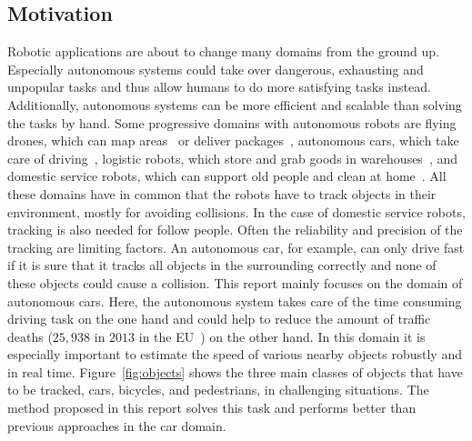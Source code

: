 \documentclass[twoside,a4paper,article]{combine}
\begin{document}
\subsection{Motivation}
\label{sub:motivation}
Robotic applications are about to change many domains from the ground
up. Especially autonomous systems could take over dangerous,
exhausting and unpopular tasks and thus allow humans to do more satisfying
tasks instead. Additionally, autonomous systems can be more efficient
and scalable than solving the tasks by hand. Some progressive domains
with autonomous robots are flying drones, which can map
areas~\cite{auto-drones} or deliver
packages~\cite{auto-delivery-drones}, autonomous cars, which take care
of driving~\cite{auto-cars}, logistic robots, which store and grab
goods in warehouses~\cite{kiva}, and domestic service robots, which
can support old people and clean at home~\cite{athome}. All these
domains have in common that the robots have to track objects in their
environment, mostly for avoiding collisions. In the case of domestic
service robots, tracking is also needed for follow people. Often the reliability
and precision of the tracking are limiting factors. An autonomous car,
for example, can only drive fast if it is sure that it
tracks all objects in the surrounding correctly and none of these
objects could cause a collision. This report mainly focuses on the
domain of autonomous cars. Here, the autonomous system takes care of
the time consuming driving task on the one hand and could help to
reduce the amount of traffic deaths ($25,938$ in $2013$ in the
EU~\cite{traffic-deaths}) on the other hand. In this domain it is
especially important to estimate the speed of various nearby objects
robustly and in real time. Figure~\ref{fig:objects} shows the three
main classes of objects that have to be tracked, cars, bicycles, and
pedestrians, in challenging situations. The method proposed in this
report solves this task and performs better than previous approaches
in the car domain.
\end{document}

